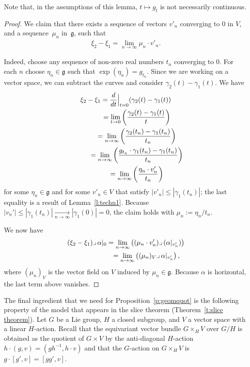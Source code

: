 \documentclass[11pt]{article}
\numberwithin{equation}{section}
\newcommand{\g}{{\mathfrak{g}}} %
\newcommand{\hook}{{\lrcorner\,}} %
\newcommand{\hypref}[2]{{#2~\ref{#1}}}
\begin{document}
Note that, in the assumptions of this lemma,
$t \mapsto g_t$ is not necessarily continuous.

\begin{proof}
We claim that there exists a sequence of vectors $v'_n$
converging to $0$ in $V$, and a sequence~$\mu_n$ in~$\g$, such that
\begin{gather*} \xi_2 - \xi_1 = \underset{n\to\infty}{\lim} \mu_n\cdot v'_n. \end{gather*}

Indeed,
choose any sequence of non-zero real numbers $t_n$ converging to $0$.
For
each $n$ choose $\eta_n \in \g$ such that $\exp(\eta_n)=g_{t_n}$.
Since we are working on a vector space, we can subtract the curves
and consider $\gamma_2(t) - \gamma_1(t)$. We have
\begin{gather*}
 \xi_2 - \xi_1 = \frac{d}{dt} \Big|_{t=0} (\gamma_2(t)-\gamma_1(t))\\
  \hphantom{\xi_2 - \xi_1}{}
 = \underset{t \to 0} {\lim}
 \left( \frac{\gamma_2(t)-\gamma_1(t)}{t} \right)\\
 \hphantom{\xi_2 - \xi_1}{}
 = \underset{n\to\infty} {\lim}
 \left( \frac{\gamma_2(t_n)-\gamma_1(t_n)}{t_n} \right) \\
 \hphantom{\xi_2 - \xi_1}{}
 = \underset{n\to\infty}{\lim}
 \left( \frac{g_{t_n} \cdot \gamma_1(t_n) - \gamma_1(t_n)}{t_n} \right)\\
 \hphantom{\xi_2 - \xi_1}{}
 = \underset{n\to\infty}{\lim}
 \left( \frac{ \eta_n \cdot v'_n }{t_n} \right)
\end{gather*}
for some $\eta_n \in \g$ and
for some $v'_n \in V$ that satisfy $ |v'_n| \leq |\gamma_1(t_n)| $;
the last equality is a result of \hypref{l:techn1}{Lemma}.
Because $|v_n'| \leq |\gamma_1(t_n)| \underset{n\to\infty}{\to} |\gamma_1(0)|
 = 0$,
the claim holds with $\mu_n := \eta_n/t_n$.

We now have
\begin{gather*}
 (\xi_2-\xi_1) \hook \alpha|_0 = \underset{n\to\infty}{\lim}
 \left( (\mu_n\cdot v'_n) \hook(\alpha|_{v'_n}) \right)\\
 \hphantom{(\xi_2-\xi_1) \hook \alpha|_0}{}
 = \underset{n\to\infty}{\lim}
 \left( (\mu_n)_V\hook\alpha|_{v'_n} \right),
\end{gather*}
where $(\mu_n)_V$ is the vector f\/ield on $V$ induced by $\mu_n\in\g$.
Because $\alpha$ is horizontal, the last term above vanishes.
\end{proof}

The f\/inal ingredient that we need for Proposition~\ref{p:geomquot} is
the following property of the model that appears in the slice theorem
(Theorem~\ref{t:slice theorem}).
Let $G$ be a Lie group, $H$ a closed subgroup, and $V$ a vector space
with a linear $H$-action. Recall that the equivariant vector bundle
$ G \times_H V $
over $G/H$ is obtained as the quotient of $G \times V$
by the anti-diagonal $H$-action $h \cdot (g,v) = (g h^{-1} , h \cdot v)$
and that the $G$-action on $G\times_H V$ is $g\cdot[g',v]=[gg',v]$.
\end{document}
